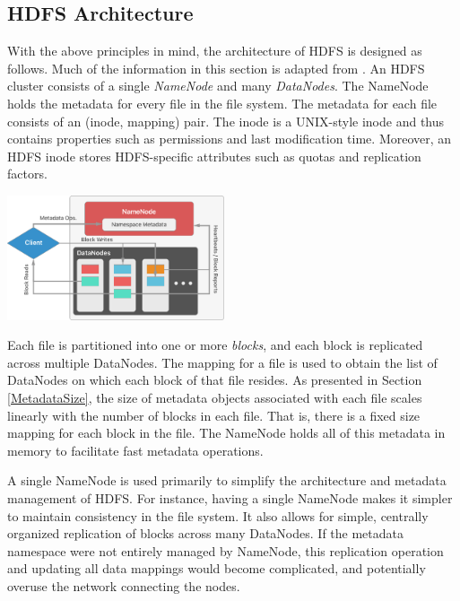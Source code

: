 \documentclass[11pt, a4paper]{article}
\begin{document}
\begin{multicols*}{2}
\section{HDFS Architecture}
With the above principles in mind, the architecture of HDFS is designed as follows. Much of the information in this section is adapted from \cite{HdfsArch}. An HDFS cluster consists of a single \textit{NameNode} and many \textit{DataNodes}. The NameNode holds the metadata for every file in the file system. The metadata for each file consists of an (inode, mapping) pair. The inode is a UNIX-style inode and thus contains properties such as permissions and last modification time. Moreover, an HDFS inode stores HDFS-specific attributes such as quotas and replication factors.

\begin{center}
	\includegraphics[keepaspectratio=true, width=0.48\textwidth]{Architecture}\\
\end{center}

Each file is partitioned into one or more \textit{blocks}, and each block is replicated across multiple DataNodes. The mapping for a file is used to obtain the list of DataNodes on which each block of that file resides. As presented in Section \ref{MetadataSize}, the size of metadata objects associated with each file scales linearly with the number of blocks in each file. That is, there is a fixed size mapping for each block in the file. The NameNode holds all of this metadata in memory to facilitate fast metadata operations.

A single NameNode is used primarily to simplify the architecture and metadata management of HDFS. For instance, having a single NameNode makes it simpler to maintain consistency in the file system. It also allows for simple, centrally organized replication of blocks across many DataNodes. If the metadata namespace were not entirely managed by NameNode, this replication operation and updating all data mappings would become complicated, and potentially overuse the network connecting the nodes.


\end{multicols*}
\end{document}
